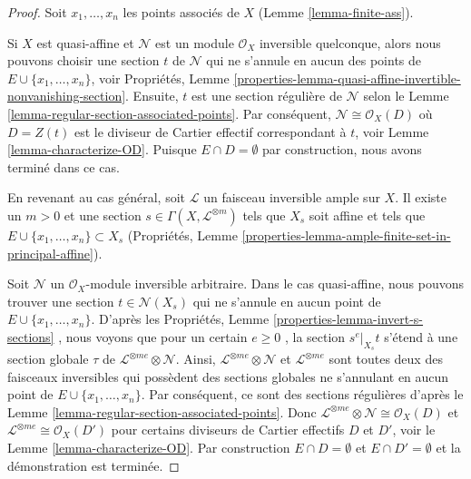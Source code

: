 \begin{proof}
Soit  $x_1, \ldots, x_n$  les points associés de  $X$  (Lemme  \ref{lemma-finite-ass}).

\medskip\noindent
Si  $X$  est quasi-affine et  $\mathcal{N}$  est un module  $\mathcal{O}_X$
inversible quelconque, alors nous pouvons choisir une section  $t$  de
 $\mathcal{N}$  qui ne s'annule en aucun des points de  $E \cup \{x_1, \ldots, x_n\}$, voir Propriétés,
Lemme  \ref{properties-lemma-quasi-affine-invertible-nonvanishing-section}. Ensuite,  $t$  est une section régulière de
 $\mathcal{N}$  selon le Lemme  \ref{lemma-regular-section-associated-points}. Par conséquent,  $\mathcal{N} \cong \mathcal{O}_X(D)$  où
 $D = Z(t)$  est le diviseur de Cartier effectif correspondant à  $t$,
voir Lemme  \ref{lemma-characterize-OD}. Puisque  $E \cap D = \emptyset$  par construction, nous avons terminé
dans ce cas.

\medskip\noindent
En revenant au cas général, soit  $\mathcal{L}$  un faisceau inversible ample sur
 $X$. Il existe un  $m > 0$  et une section  $s \in \Gamma(X, \mathcal{L}^{\otimes m})$  tels que
 $X_s$  soit affine et tels que  $E \cup \{x_1, \ldots, x_n\} \subset X_s$  (Propriétés, Lemme
 \ref{properties-lemma-ample-finite-set-in-principal-affine}).

\medskip\noindent
Soit  $\mathcal{N}$  un  $\mathcal{O}_X$-module inversible arbitraire. Dans le cas
quasi-affine, nous pouvons trouver une section  $t \in \mathcal{N}(X_s)$  qui ne s'annule en
aucun point de  $E \cup \{x_1, \ldots, x_n\}$. D'après les Propriétés, Lemme  \ref{properties-lemma-invert-s-sections} , nous
voyons que pour un certain  $e \geq 0$ , la section  $s^e|_{X_s} t$  s'étend à une
section globale  $\tau$  de  $\mathcal{L}^{\otimes me} \otimes \mathcal{N}$. Ainsi,  $\mathcal{L}^{\otimes me} \otimes \mathcal{N}$  et  $\mathcal{L}^{\otimes me}$ 
sont toutes deux des faisceaux inversibles qui possèdent des sections globales ne
s'annulant en aucun point de  $E \cup \{x_1, \ldots, x_n\}$. Par conséquent, ce sont des sections
régulières d'après le Lemme  \ref{lemma-regular-section-associated-points}. Donc  $\mathcal{L}^{\otimes me} \otimes \mathcal{N} \cong \mathcal{O}_X(D)$  et  $\mathcal{L}^{\otimes me} \cong \mathcal{O}_X(D')$  pour
certains diviseurs de Cartier effectifs  $D$  et  $D'$, voir le
Lemme  \ref{lemma-characterize-OD}. Par construction  $E \cap D = \emptyset$  et  $E \cap D' = \emptyset$  et la
démonstration est terminée.
\end{proof}

